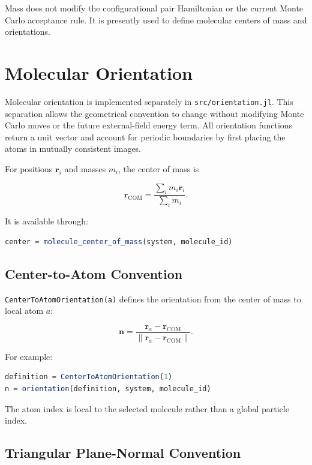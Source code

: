 \documentclass[11pt]{article}
\begin{document}
Mass does not modify the configurational pair Hamiltonian or the current Monte
Carlo acceptance rule. It is presently used to define molecular centers of mass
and orientations.

\section{Molecular Orientation}

Molecular orientation is implemented separately in
\texttt{src/orientation.jl}. This separation allows the geometrical convention
to change without modifying Monte Carlo moves or the future external-field
energy term. All orientation functions return a unit vector and account for
periodic boundaries by first placing the atoms in mutually consistent images.

For positions \(\mathbf r_i\) and masses \(m_i\), the center of mass is

\begin{equation}
\mathbf r_{\mathrm{COM}}
=
\frac{\sum_i m_i\mathbf r_i}{\sum_i m_i}.
\end{equation}

It is available through:

\begin{lstlisting}[language=Julia]
center = molecule_center_of_mass(system, molecule_id)
\end{lstlisting}

\subsection{Center-to-Atom Convention}

\texttt{CenterToAtomOrientation(a)} defines the orientation from the center of
mass to local atom \(a\):

\begin{equation}
\mathbf n
=
\frac{\mathbf r_a-\mathbf r_{\mathrm{COM}}}
     {\lVert\mathbf r_a-\mathbf r_{\mathrm{COM}}\rVert}.
\end{equation}

For example:

\begin{lstlisting}[language=Julia]
definition = CenterToAtomOrientation(1)
n = orientation(definition, system, molecule_id)
\end{lstlisting}

The atom index is local to the selected molecule rather than a global particle
index.

\subsection{Triangular Plane-Normal Convention}
\end{document}
